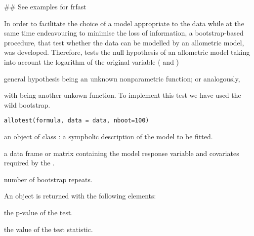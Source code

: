 %
\begin{Examples}
\begin{ExampleCode}
## See examples for frfast
\end{ExampleCode}
\end{Examples}



%
\begin{Description}\relax
In order to facilitate the choice of a model appropriate to the data while at the same time endeavouring to minimise the loss of information,  a bootstrap-based procedure, that test whether the data can be modelled by an allometric model, was developed.  Therefore,  tests  the null hypothesis of an allometric model taking into account the logarithm of the original variable ( and )


 general hypothesis  being  an unknown nonparametric function; or analogously,


with  being another unkown function. To implement this test we have used the wild bootstrap. 
\end{Description}
%
\begin{Usage}
\begin{verbatim}
allotest(formula, data = data, nboot=100)
\end{verbatim}
\end{Usage}
%
\begin{Arguments}
\begin{ldescription}
\item[\code{formula}] an object of class : a sympbolic description of the model to be fitted. 

\item[\code{data}] a data frame or matrix containing the model response variable and covariates required by the .

\item[\code{nboot}] number of bootstrap repeats.

\end{ldescription}
\end{Arguments}
%
\begin{Value}
An object is returned with the following elements:
\begin{ldescription}
\item[\code{value}] the p-value of the test.
\item[\code{statistic}] the value of the test statistic.
\end{ldescription}
\end{Value}
